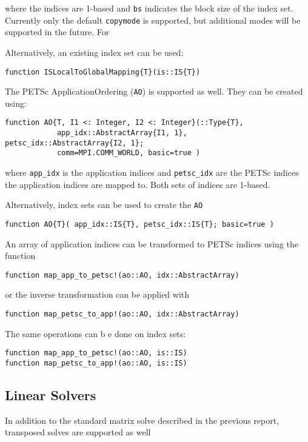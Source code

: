 \documentclass{article}
\begin{document}
\noindent where the indices are 1-based and \texttt{bs} indicates the block size of the 
index set.  Currently only the default \texttt{copymode} is supported,
but additional modes will be supported in the future.  For

Alternatively, an existing index set can be used:
\begin{verbatim}
function ISLocalToGlobalMapping{T}(is::IS{T})
\end{verbatim}

\hfill \break

The PETSc ApplicationOrdering (\texttt{AO}) is supported as well.
They can be created using:

\begin{verbatim}
function AO{T, I1 <: Integer, I2 <: Integer}(::Type{T}, 
            app_idx::AbstractArray{I1, 1}, petsc_idx::AbstractArray{I2, 1}; 
            comm=MPI.COMM_WORLD, basic=true )
\end{verbatim}

\noindent where \texttt{app\_idx} is the application indices and 
\texttt{petsc\_idx} are
the PETSc indices the application indices are mapped to.  Both sets of 
indices are 1-based.

Alternatively, index sets can be used to create the \texttt{AO}
\begin{verbatim}
function AO{T}( app_idx::IS{T}, petsc_idx::IS{T}; basic=true )
\end{verbatim}

\noindent An array of application indices can be transformed to PETSc indices using
the function

\begin{verbatim}
function map_app_to_petsc!(ao::AO, idx::AbstractArray)
\end{verbatim}

\noindent or the inverse transformation can be applied with

\begin{verbatim}
function map_petsc_to_app!(ao::AO, idx::AbstractArray)
\end{verbatim}

\noindent The same operations can b e done on index sets:

\begin{verbatim}
function map_app_to_petsc!(ao::AO, is::IS)
function map_petsc_to_app!(ao::AO, is::IS)
\end{verbatim}



\subsection{Linear Solvers} \label{sec:ksp}
In addition to the standard matrix solve described in the previous report, 
transposed solves are supported as well
\end{document}
